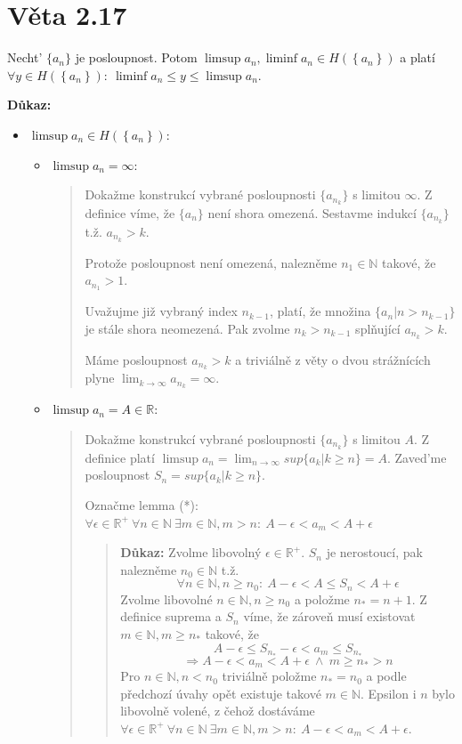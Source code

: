 \documentclass[12pt]{article}
\begin{document}
\section*{Věta 2.17}

Necht' $\{a_n\}$ je posloupnost. Potom $\limsup a_n, \liminf a_n \in H\left(\left\{a_n\right\}\right)$
a platí $\forall y \in H\left(\left\{a_n\right\}\right) :\ \liminf a_n \leq y \leq \limsup a_n$.

\textbf{Důkaz:}

\begin{itemize}
  \item $\limsup a_n \in H\left(\left\{a_n\right\}\right)$:
    \begin{itemize}
      \item $\limsup a_n = \infty$:
        \begin{quote}
          Dokažme konstrukcí vybrané posloupnosti $\{a_{n_k}\}$ s limitou $\infty$. Z definice víme, že $\{a_n\}$ není shora omezená.
          Sestavme indukcí $\{a_{n_k}\}$ t.ž. $a_{n_k} > k$.
          
          Protože posloupnost není omezená, nalezněme $n_1 \in \mathbb{N}$ takové, že $a_{n_1} > 1$.

          Uvažujme již vybraný index $n_{k-1}$, platí, že množina $\{a_n | n>n_{k-1}\}$ je stále shora neomezená.
          Pak zvolme $n_k > n_{k-1}$ splňující $a_{n_k} > k$.

          Máme posloupnost $a_{n_k} > k$ a triviálně z věty o dvou strážnících plyne $\lim_{k\to\infty} a_{n_k} = \infty$.
        \end{quote}
      \item $\limsup a_n = A \in \mathbb{R}$:
        \begin{quote}
          Dokažme konstrukcí vybrané posloupnosti $\{a_{n_k}\}$ s limitou $A$.
          Z definice platí $\limsup a_n = \lim_{n\to\infty} sup\{a_k | k\geq n\}= A$.
          Zaved'me posloupnost $S_n = sup\{a_k | k \geq n\}$.

          Označme lemma (*): $\forall \epsilon \in \mathbb{R}^+ \ \forall n \in \mathbb{N} \ \exists m \in \mathbb{N}, m>n:\ A-\epsilon < a_m < A+\epsilon$
          \begin{quote}
            \textbf{Důkaz:} Zvolme libovolný $\epsilon \in \mathbb{R}^+$. $S_n$ je nerostoucí, pak nalezněme $n_0 \in \mathbb{N}$ t.ž.
              \[ \forall n \in \mathbb{N}, n\geq n_0:\ A-\epsilon < A \leq S_n < A+\epsilon \]
              Zvolme libovolné $n\in\mathbb{N}, n\geq n_0$ a položme $n_* = n+1$.
              Z definice suprema a $S_n$ víme, že zároveň musí existovat $m\in\mathbb{N}, m\geq n_*$ takové, že
              \[ A-\epsilon \leq S_{n_*} - \epsilon < a_m \leq S_{n_*}\]
              \[ \Rightarrow A-\epsilon < a_m < A+\epsilon\ \land \ m\geq n_* > n\]
              Pro $n\in\mathbb{N}, n < n_0$ triviálně položme $n_* = n_0$ a podle předchozí úvahy opět existuje takové $m\in\mathbb{N}$.
              Epsilon i $n$ bylo libovolně volené, z čehož dostáváme
              $\forall\epsilon\in\mathbb{R}^+\ \forall n\in\mathbb{N}\ \exists m\in\mathbb{N}, m>n:\ A-\epsilon < a_m < A+\epsilon$.
          \end{quote}


\end{quote}
\end{itemize}
\end{itemize}
\end{document}
